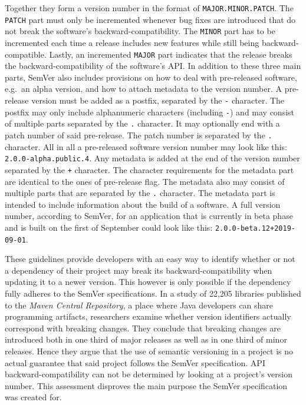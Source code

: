 Together they form a version number in the format of
\texttt{MAJOR.MINOR.PATCH}. The \texttt{PATCH} part must only be incremented
whenever bug fixes are introduced that do not break the software's
backward-compatibility. The \texttt{MINOR} part has to be incremented each
time a release includes new features while still being backward-compatible.
Lastly, an incremented \texttt{MAJOR} part indicates that the release breaks
the backward-compatibility of the software's \ac{API}. In addition to these
three main parts, SemVer also includes provisions on how to deal with
pre-released software, e.g.\ an alpha version, and how to attach metadata to
the version number. A pre-release version must be added as a postfix,
separated by the \texttt{-} character. The postfix may only include
alphanumeric characters (including \texttt{-}) and may consist of multiple
parts separated by the \texttt{.} character. It may optionally end with a patch
number of said pre-release. The patch number is separated by the \texttt{.}
character. All in all a pre-released software version number may look like
this: \texttt{2.0.0-alpha.public.4}. Any metadata is added at the end of the
version number separated by the \texttt{+} character. The character
requirements for the metadata part are identical to the ones of pre-release
flag. The metadata also may consist of multiple parts that are separated by the
\texttt{.} character. The metadata part is intended to include information
about the build of a software. A full version number, according to SemVer, for
an application that is currently in beta phase and is built on the first of
September could look like this: \texttt{2.0.0-beta.12+2019-09-01}.

These guidelines provide developers with an easy way to identify whether or not
a dependency of their project may break its backward-compatibility when
updating it to a newer version. This however is only possible if the dependency
fully adheres to the SemVer specifications. In a study
\autocite{RaemaekersSemanticVersioningversus2014} of 22,205 libraries published
to the \textit{Maven Central Repository}, a place where Java developers can
share programming artifacts, researchers examine whether version identifiers
actually correspond with breaking changes. They conclude that breaking changes
are introduced both in one third of major releases as well as in one third of
minor releases. Hence they argue that the use of semantic versioning in a
project is no actual guarantee that said project follows the SemVer
specification. \ac{API} backward-compatibility can not be determined by looking
at a project's version number. This assessment disproves the main purpose the
SemVer specification was created for.

